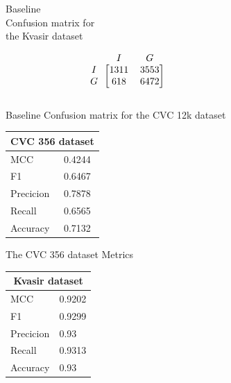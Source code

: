 \begin{figure}[h]
\begin{subfigure}[b]{0.49\textwidth}
        
\caption{Baseline \\Confusion matrix for \\the Kvasir dataset}
\label{mat:kvasir_CM_DN121_base}
\end{subfigure}
\begin{subfigure}[b]{0.25\textwidth}
        \[
\begin{blockarray}{ccc}
& I & G  \\
\begin{block}{c[cc]}
 		I&1311 & 3553\\
        G&618  & 6472\\
\end{block}
\end{blockarray}
\]   
\caption{Baseline Confusion matrix for the CVC 12k dataset}
\label{mat:cvc12k_CM_DN121_base}
\end{subfigure}

\vspace{1cm}

\begin{subfigure}[t]{0.25\textwidth}
\begin{tabular}{ll}      
        \toprule
        \multicolumn{2}{c}{CVC 356 dataset}        \\
        \midrule
        MCC 		& 0.4244 \\
        F1  		& 0.6467 \\
        Precicion  	& 0.7878 \\
        Recall     	& 0.6565 \\
        Accuracy	& 0.7132 \\
        \bottomrule
        \end{tabular}
\caption{The CVC 356 dataset Metrics}
\label{tab:cvc356_metrics_DN121_base}
\end{subfigure}%
\begin{subfigure}[t]{0.49\textwidth}
    	\centering
        \begin{tabular}{ll}
        \toprule
        \multicolumn{2}{c}{Kvasir dataset}        \\
        \midrule
        MCC 		& 0.9202 \\
        F1  		& 0.9299 \\
        Precicion  	& 0.93 \\
        Recall     	& 0.9313  \\
        Accuracy	& 0.93 \\
        

\end{tabular}
\end{subfigure}
\end{figure}
